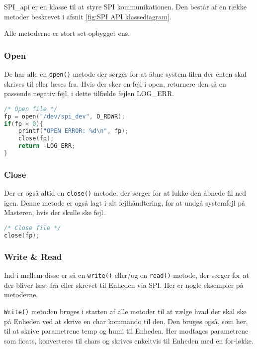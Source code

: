 
SPI\_api er en klasse til at styre SPI kommunikationen. Den består af en række metoder beskrevet i afsnit \ref{fig:SPI API klassediagram}.

Alle metoderne er stort set opbygget ens.

\subsubsection*{Open}

De har alle en \verb+open()+ metode der sørger for at åbne system filen der enten skal skrives til eller læses fra. Hvis der sker en fejl i open, returnere den så en passende negativ fejl, i dette tilfælde fejlen LOG\_ERR.

\begin{lstlisting}[language=C]
/* Open file */
fp = open("/dev/spi_dev", O_RDWR);
if(fp < 0){
	printf("OPEN ERROR: %d\n", fp);
	close(fp);
	return -LOG_ERR;
}
\end{lstlisting}

\subsubsection*{Close}

Der er også altid en \verb+close()+ metode, der sørger for at lukke den åbnede fil ned igen. Denne metode er også lagt i alt fejlhåndtering, for at undgå systemfejl på Masteren, hvis der skulle ske fejl.



\begin{lstlisting}[language=C]
/* Close file */
close(fp);
\end{lstlisting}

\subsubsection*{Write \& Read}

Ind i mellem disse er så en \verb+write()+ eller/og en \verb+read()+ metode, der sørger for at der bliver læst fra eller skrevet til Enheden via SPI. Her er nogle eksempler på metoderne.

\verb+Write()+ metoden bruges i starten af alle metoder til at vælge hvad der skal ske på Enheden ved at skrive en char kommando til den. Den bruges også, som her, til at skrive parametrene temp og humi til Enheden. Her modtages parametrene som floats, konverteres til chars og skrives enkeltvis til Enheden med en for-løkke.

